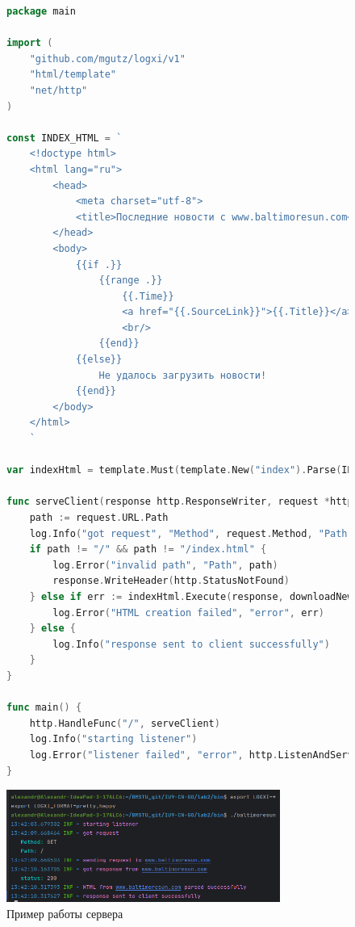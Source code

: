 \documentclass[a4paper, 14pt]{extarticle}
\begin{document}
\newpage
\begin{figure}[!htb]
\begin{lstlisting}[language={Go},caption={server.go},label={lst:code3}]
package main

import (
	"github.com/mgutz/logxi/v1"
	"html/template"
	"net/http"
)

const INDEX_HTML = `
    <!doctype html>
    <html lang="ru">
        <head>
            <meta charset="utf-8">
            <title>Последние новости с www.baltimoresun.com</title>
        </head>
        <body>
            {{if .}}
                {{range .}}
                    {{.Time}}
                    <a href="{{.SourceLink}}">{{.Title}}</a>
                    <br/>
                {{end}}
            {{else}}
                Не удалось загрузить новости!
            {{end}}
        </body>
    </html>
    `

var indexHtml = template.Must(template.New("index").Parse(INDEX_HTML))

func serveClient(response http.ResponseWriter, request *http.Request) {
	path := request.URL.Path
	log.Info("got request", "Method", request.Method, "Path", path)
	if path != "/" && path != "/index.html" {
		log.Error("invalid path", "Path", path)
		response.WriteHeader(http.StatusNotFound)
	} else if err := indexHtml.Execute(response, downloadNews()); err != nil {
		log.Error("HTML creation failed", "error", err)
	} else {
		log.Info("response sent to client successfully")
	}
}

func main() {
	http.HandleFunc("/", serveClient)
	log.Info("starting listener")
	log.Error("listener failed", "error", http.ListenAndServe("127.0.0.1:6060", nil))
}

\end{lstlisting}
\end{figure}

\newpage

\begin{figure}[!htb]
	\centering
	\includegraphics[width=0.8\textwidth]{res.png}
\caption{Пример работы сервера}
\label{fig:img1}
\end{figure}
\end{document}
